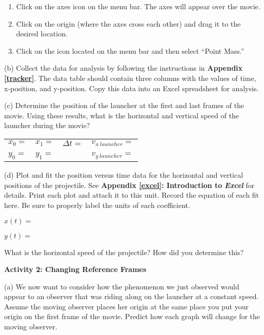 \begin{enumerate}
\item Click on the axes icon on the menu bar.
The axes will appear over the movie. 

\item Click on the origin (where the axes cross each other) and drag it to
the desired location.

\item Click on the  icon located on the menu bar and then select ``Point Mass.''
\end{enumerate}

(b) Collect the data for analysis by following the instructions in
\textbf{Appendix \ref{tracker}}. The data table should contain three columns with
the values of time, x-position, and y-position. Copy this data into an Excel spreadsheet for analysis.

(c) Determine the position of the launcher at the first and last frames
of the movie. Using these results, what is the horizontal and vertical
speed of the launcher during the movie?

\vspace{0.3cm}
{\centering \begin{tabular}{p{20mm}p{20mm}p{30mm}p{70mm}}
\( x_{0}= \) &
\( x_{1}= \)&
\( \Delta t= \)&
\( v_{x\ launcher}= \) \\
&
&
&
\\
\( y_{0}= \)&
\( y_{1}= \) &
&
\( v_{y\ launcher} =\) \\
\end{tabular}\par}
\vspace{0.3cm}

(d) Plot and fit the position versus time data for the horizontal
and vertical positions of the projectile. See \textbf{Appendix \ref{excel}:
Introduction to} \textbf{\emph{Excel}} for details. Print each
plot and attach it to this unit. Record the equation of each fit here.
Be sure to properly label the units of each coefficient.

$x(t) =$
\vspace*{5mm}

$y(t) =$
\vspace{5mm}

What is the horizontal speed of the projectile? How did you determine
this?
\vspace{2in}

\textbf{Activity 2: Changing Reference Frames}

(a) We now want to consider how the phenomenon we just observed would
appear to an observer that was riding along on the launcher at a constant
speed. Assume the moving observer places her origin at the same place
you put your origin on the first frame of the movie. Predict how each
graph will change for the moving observer.


